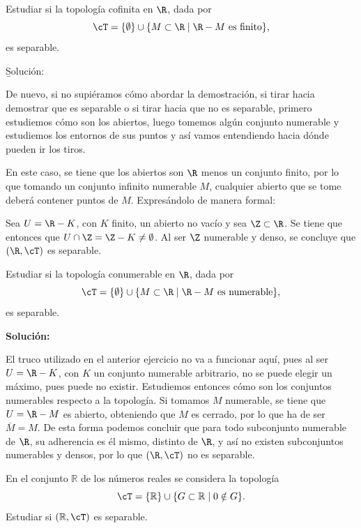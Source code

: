 \begin{ex}
    Estudiar si la topología cofinita en $\R$, dada por
    \[
        \cT = \{\emptyset\} \cup \{M\subset\R\mid \R- M \text{ es finito}\},
    \]
    es separable.

    \bigskip

    {\b Solución:}

    De nuevo, si no supiéramos cómo abordar la demostración, si tirar hacia demostrar que es separable o si tirar hacia que no es separable, primero estudiemos cómo son los abiertos, luego tomemos algún conjunto numerable y estudiemos los entornos de sus puntos y así vamos entendiendo hacia dónde pueden ir los tiros.

    En este caso, se tiene que los abiertos son $\R$ menos un conjunto finito, por lo que tomando un conjunto infinito numerable $M$, cualquier abierto que se tome deberá contener puntos de $M$. Expresándolo de manera formal:

    Sea $U = \R - K$, con $K$ finito, un abierto no vacío y sea $\Z\subset\R$. Se tiene que entonces que $U\cap\Z = \Z - K \neq \emptyset$. Al ser $\Z$ numerable y denso, se concluye que $(\R, \cT)$ es separable.
\end{ex}

\begin{ex}
    Estudiar si la topología conumerable en $\R$, dada por
    \[
        \cT = \{\emptyset\} \cup \{M\subset\R\mid \R- M \text{ es numerable}\},
    \]
    es separable.
    
    \bigskip

    {\bf Solución:}

    El truco utilizado en el anterior ejercicio no va a funcionar aquí, pues al ser $U = \R - K$, con $K$ un conjunto numerable arbitrario, no se puede elegir un máximo, pues puede no existir. Estudiemos entonces cómo son los conjuntos numerables respecto a la topología. Si tomamos $M$ numerable, se tiene que $U = \R - M$ es abierto, obteniendo que $M$ es cerrado, por lo que ha de ser $\overline{M} = M$. De esta forma podemos concluir que para todo subconjunto numerable de $\R$, su adherencia es él mismo, distinto de $\R$, y así no existen subconjuntos numerables y densos, por lo que $(\R, \cT)$ no es separable.
\end{ex}

\begin{ex}
    En el conjunto \(\mathbb{R}\) de los números reales se considera la topología
    \[
        \cT = \{\mathbb{R}\} \cup \{G \subset \mathbb{R} \mid 0 \notin G\}.
    \]
    Estudiar si \((\mathbb{R}, \cT)\) es separable.
\end{ex}

